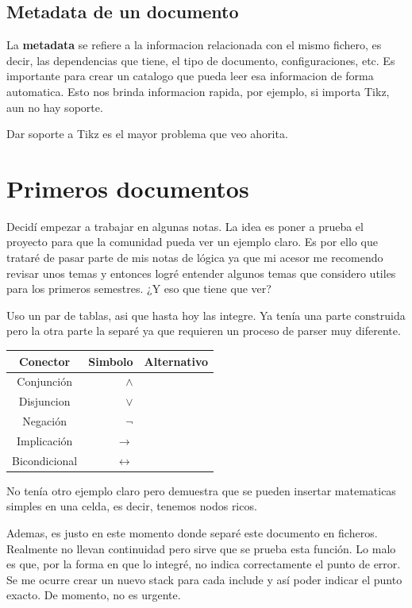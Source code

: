 \documentclass{article}
\begin{document}
  \section{ Metadata de un documento }
  
  La {\bfseries metadata} se refiere a la informacion relacionada con el mismo fichero,
  es decir, las dependencias que tiene, el tipo de documento, configuraciones, etc. Es
  importante para crear un catalogo que pueda leer esa informacion de forma automatica.
  Esto nos brinda informacion rapida, por ejemplo, si importa Tikz, aun no hay soporte.
  
  \alert{ Dar soporte a Tikz es el mayor problema que veo ahorita. }
  
  \chapter{ Primeros documentos }
  
  Decidí empezar a trabajar en algunas notas. La idea es poner a prueba el proyecto para
  que la comunidad pueda ver un ejemplo claro. Es por ello que trataré de pasar parte de
  mis notas de lógica ya que mi acesor me recomendo revisar unos temas y entonces logré
  entender algunos temas que considero utiles para los primeros semestres. ¿Y eso que
  tiene que ver?
  
  Uso un par de tablas, asi que hasta hoy las integre. Ya tenía una parte construida pero
  la otra parte la separé ya que requieren un proceso de parser muy diferente.
  
  \begin{tabular}{ c|rr }
    Conector & Simbolo & Alternativo \\
    \hline
    Conjunción    & $ \land $ & \\
    Disjuncion    & $ \lor $ & \\
    Negación      & $ \neg $ & ~ \\
    Implicación   & $ \rightarrow $ & \\
    Bicondicional & $ \leftrightarrow $ & \\
    \hline
  \end{tabular}
  
  No tenía otro ejemplo claro pero demuestra que se pueden insertar matematicas simples
  en una celda, es decir, tenemos nodos ricos.
  
  Ademas, es justo en este momento donde separé este documento en ficheros. Realmente no
  llevan continuidad pero sirve que se prueba esta función. Lo malo es que, por la forma
  en que lo integré, no indica correctamente el punto de error. Se me ocurre crear un
  nuevo stack para cada include y así poder indicar el punto exacto. De momento, no es urgente.

  

  
\end{document}
